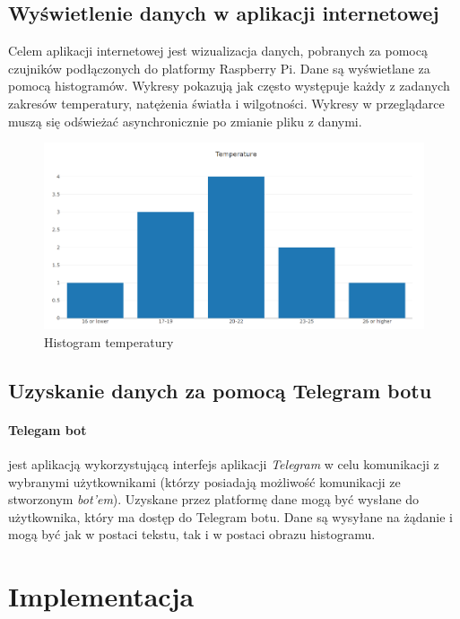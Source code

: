 \documentclass[a4paper]{article}
\begin{document}
\subsection{Wyświetlenie danych w aplikacji internetowej}

Celem aplikacji internetowej jest wizualizacja danych, pobranych za pomocą czujników podłączonych do platformy Raspberry Pi.
Dane są wyświetlane za pomocą histogramów. Wykresy pokazują jak często występuje każdy z zadanych zakresów temperatury, natężenia światła i wilgotności.
Wykresy w przeglądarce muszą się odświeżać asynchronicznie po zmianie pliku z danymi.
\begin{figure}[H]
\centering
\includegraphics[scale=0.3]{exampleChart.png}
\caption{Histogram temperatury}
\end{figure}

\subsection{Uzyskanie danych za pomocą Telegram botu}

\paragraph{Telegam bot} jest aplikacją wykorzystującą interfejs aplikacji \textit{Telegram}
w celu komunikacji z wybranymi użytkownikami (którzy posiadają możliwość komunikacji ze stworzonym
\textit{bot'em}).\newline
Uzyskane przez platformę dane mogą być wysłane do użytkownika, który ma dostęp do Telegram botu. Dane są wysyłane na żądanie i mogą być jak w postaci tekstu, tak i w postaci obrazu histogramu.



\section{Implementacja}
       
\end{document}

